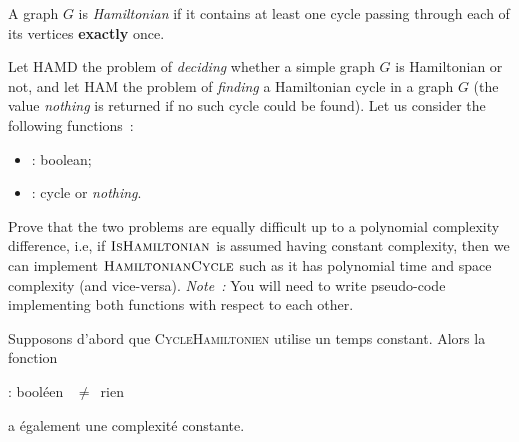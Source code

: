 \documentclass[12pt,addpoints]{exam}
\begin{document}
\begin{questions}

\question
A graph $G$ is \emph{Hamiltonian} if it contains at least one cycle passing through each of its vertices \textbf{exactly} once.

Let HAMD the problem of \emph{deciding} whether a simple graph $G$ is Hamiltonian or not, and let HAM the problem of \emph{finding} a Hamiltonian cycle in a graph $G$ (the value \emph{nothing} is returned if no such cycle could be found). Let us consider the following functions~:
\begin{itemize}
  \item {} : boolean;
  \item {} : cycle or \emph{nothing}.
\end{itemize}
Prove that the two problems are equally difficult up to a polynomial complexity difference, i.e, if $\textsc{IsHamiltonian}$ is assumed having constant complexity, then we can implement $\textsc{HamiltonianCycle}$ such as it has polynomial time and space complexity (and vice-versa). \emph{Note~:} You will need to write pseudo-code implementing both functions with respect to each other.
\begin{solution}
Supposons d'abord que \textsc{CycleHamiltonien} utilise un temps constant. Alors la fonction
\begin{algorithmic}[1]
   : booléen
    \State \Return {}~$\neq$~rien
  \EndFunction
\end{algorithmic}
a également une complexité constante.


\end{solution}
\end{questions}
\end{document}
